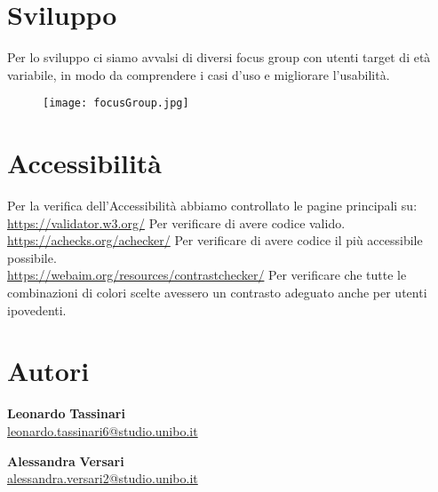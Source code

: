 \section{Sviluppo}
Per lo sviluppo ci siamo avvalsi di diversi focus group con utenti target di età variabile, in modo da comprendere i casi d'uso e migliorare l'usabilità.
\begin{figure}[H]
    \centering
    \texttt{[image: focusGroup.jpg]}
\end{figure}
\section{Accessibilità}
Per la verifica dell'Accessibilità abbiamo controllato le pagine principali su:\\
\href{https://validator.w3.org/}{https://validator.w3.org/} Per verificare di avere codice valido.\\
\href{https://achecks.org/achecker/}{https://achecks.org/achecker/} Per verificare di avere codice il più accessibile possibile.\\
\href{https://webaim.org/resources/contrastchecker/}{https://webaim.org/resources/contrastchecker/} Per verificare che tutte le combinazioni di colori scelte avessero un contrasto adeguato anche per utenti ipovedenti.
\section{Autori}
\begin{minipage}[t]{0.4\textwidth}
    \textbf{Leonardo} \textbf{Tassinari}\\
    \href{mailto:leonardo.tassinari6@studio.unibo.it}{leonardo.tassinari6@studio.unibo.it}
\end{minipage}%
\hfill
\begin{minipage}[t]{0.3\textwidth}
\end{minipage}
\begin{minipage}[t]{0.4\textwidth}
    \textbf{Alessandra} \textbf{Versari}\\
    \href{mailto:alessandra.versari2@studio.unibo.it}{alessandra.versari2@studio.unibo.it}
\end{minipage}%
\hfill
\begin{minipage}[t]{0.3\textwidth}
\end{minipage}